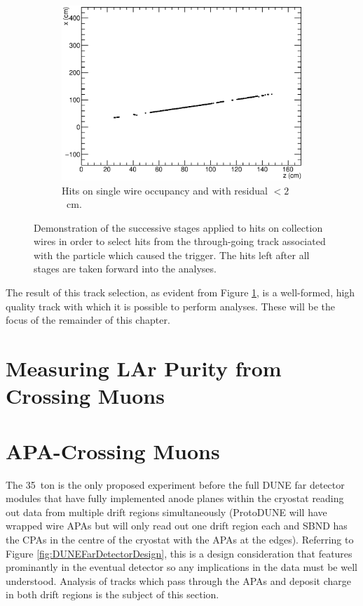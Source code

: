 \begin{figure}[ht]
\begin{subfigure}[t]{0.48\linewidth}
    \centering
    \includegraphics[width=\textwidth]{hitselection_final.eps}
    \caption{Hits on single wire occupancy and with residual $<2$~cm.}
    \label{fig:TrackSelectionFinal}
  \end{subfigure}
  \caption[Selecting tracks for 35~ton data analysis]{Demonstration of the successive stages applied to hits on collection wires in order to select hits from the through-going track associated with the particle which caused the trigger.  The hits left after all stages are taken forward into the analyses.}
  \label{fig:TrackSelection}
\end{figure}

The result of this track selection, as evident from Figure \ref{fig:TrackSelectionFinal}, is a well-formed, high quality track with which it is possible to perform analyses.  These will be the focus of the remainder of this chapter.

\section{Measuring LAr Purity from Crossing Muons}\label{sec:PurityAnalysis}

\section{APA-Crossing Muons}\label{sec:APACrossing}

The 35~ton is the only proposed experiment before the full DUNE far detector modules that have fully implemented anode planes within the cryostat reading out data from multiple drift regions simultaneously (ProtoDUNE will have wrapped wire APAs but will only read out one drift region each and SBND has the CPAs in the centre of the cryostat with the APAs at the edges).  Referring to Figure \ref{fig:DUNEFarDetectorDesign}, this is a design consideration that features prominantly in the eventual detector so any implications in the data must be well understood.  Analysis of tracks which pass through the APAs and deposit charge in both drift regions is the subject of this section.

